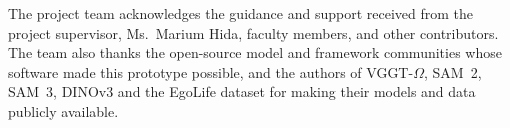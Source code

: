 The project team acknowledges the guidance and support received from the
project supervisor, Ms.\ Marium Hida, faculty members, and other contributors.
The team also thanks the open-source model and framework communities whose
software made this prototype possible, and the authors of VGGT-$\Omega$, SAM~2,
SAM~3, DINOv3 and the EgoLife dataset for making their models and data publicly
available.
